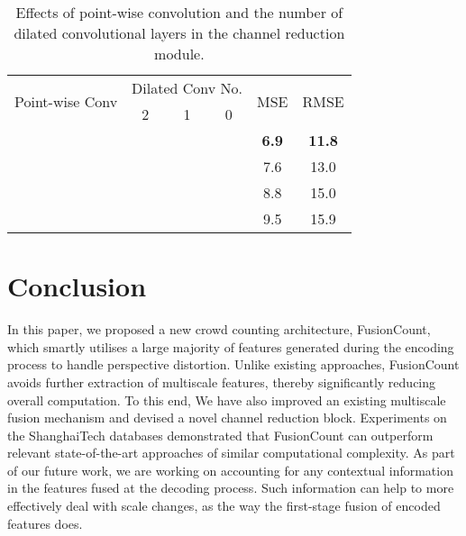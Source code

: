 \documentclass{article}
\newcommand{\cmark}{\text{\ding{51}}}
\newcommand{\xmark}{\text{\ding{55}}}
\begin{document}
\begin{table}[htbp]
\centering \caption{Effects of point-wise convolution and the number of dilated convolutional layers in the channel reduction module.}
\vspace{1mm}
\renewcommand*{\arraystretch}{1.4}
\begin{tabular}{ c | c | c | c | c | c }
\toprule
\multirow{2}{*}{Point-wise Conv} & \multicolumn{3}{c|}{Dilated Conv No.} & \multirow{2}{*}{MSE} & \multirow{2}{*}{RMSE} \\
\cline{2-4}
              & 2      & 1      & 0      &              &  \\
\cline{1-6}
\cmark        & \cmark &        &        & \textbf{6.9} & \textbf{11.8} \\
\cmark        &        & \cmark &        & 7.6          & 13.0 \\
\cmark        &        &        & \cmark & 8.8          & 15.0 \\
\xmark        & \cmark &        &        & 9.5          & 15.9 \\
\bottomrule
\end{tabular}
\label{table:3}
\end{table}  
\section{Conclusion}
\label{sec:conclusion}

In this paper, we proposed a new crowd counting architecture, FusionCount, which smartly utilises a large majority of features generated during the encoding process to handle perspective distortion. Unlike existing approaches, FusionCount avoids further extraction of multiscale features, thereby significantly reducing overall computation. To this end, We have also improved an existing multiscale fusion mechanism and devised a novel channel reduction block. Experiments on the ShanghaiTech databases demonstrated that FusionCount can outperform relevant state-of-the-art approaches of similar computational complexity. As part of our future work, we are working on accounting for any contextual information in the features fused at the decoding process. Such information can help to more effectively deal with scale changes, as the way the first-stage fusion of encoded features does.
 





\end{document}
